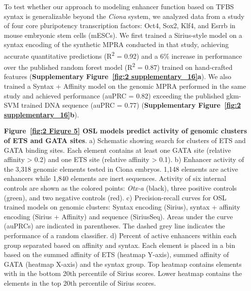 To test whether our approach to modeling enhancer function based on TFBS syntax is generalizable beyond the \textit{Ciona} system, we analyzed data from a study of four core pluripotency transcription factors: Oct4, Sox2, Klf4, and Esrrb in mouse embryonic stem cells (mESCs)\cite{King2020-hk}. We first trained a Sirius-style model on a syntax encoding of the synthetic MPRA conducted in that study, achieving accurate quantitative predictions (R\textsuperscript{2} = 0.92) and a 6\% increase in performance over the published random forest model (R\textsuperscript{2} = 0.87) trained on hand-crafted features (\textbf{Supplementary Figure~\ref{fig:2 supplementary_16}a}). We also trained a Syntax + Affinity model on the genomic MPRA performed in the same study and achieved performance (auPRC = 0.82) exceeding the published gkm-SVM trained DNA sequence (auPRC = 0.77) (\textbf{Supplementary Figure~\ref{fig:2 supplementary_16}b}).

\clearpage

\thispagestyle{plain}
\noindent
\textbf{Figure~\ref{fig:2 Figure 5} OSL models predict activity of genomic clusters of ETS and GATA sites}. a) Schematic showing search for clusters of ETS and GATA binding sites. Each element contains at least one GATA site (relative affinity > 0.2) and one ETS site (relative affinity > 0.1). b) Enhancer activity of the 3,318 genomic elements tested in Ciona embryos. 1,148 elements are active enhancers while 1,840 elements are inert sequences. Activity of six internal controls are shown as the colored points: \textit{Otx-a} (black), three positive controls (green), and two negative controls (red). c) Precision-recall curves for OSL trained models on genomic clusters: Syntax encoding (Sirius), syntax + affinity encoding (Sirius + Affinity) and sequence (SiriusSeq). Areas under the curve (auPRCs) are indicated in parentheses. The dashed grey line indicates the performance of a random classifier. d) Percent of active enhancers within each group separated based on affinity and syntax. Each element is placed in a bin based on the summed affinity of ETS (heatmap Y-axis), summed affinity of GATA (heatmap X-axis) and the syntax group. Top heatmap contains elements with in the bottom 20th percentile of Sirius scores. Lower heatmap contains the elements in the top 20th percentile of Sirius scores.

\clearpage

